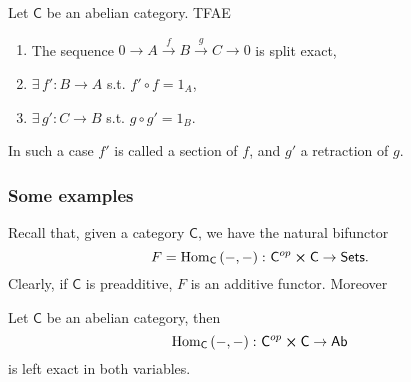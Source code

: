 \begin{prop}
	Let $\mathsf{C}$ be an abelian category.
	TFAE
	\begin{enumerate}
		\item The sequence $0 \to A \xrightarrow{f} B \xrightarrow{g} C \to 0$ is split exact,
		\item $\exists\, f'\colon B \to A$ s.t. $f' \circ f = 1_A$,
		\item $\exists\, g'\colon C \to B$ s.t. $g \circ g' = 1_B$.
	\end{enumerate}
	In such a case $f'$ is called a section of $f$, and $g'$ a retraction of $g$.
\end{prop} 

\subsubsection{Some examples}
Recall that, given a category $\mathsf{C}$, we have the natural bifunctor
\begin{equation}
F = \mathrm{Hom}_{\mathsf{C}} \left( - , - \right)\colon \mathsf{C}^{op} \cross \mathsf{C} \to \mathsf{Sets}
.\end{equation} 
Clearly, if $\mathsf{C}$ is preadditive, $F$ is an additive functor. Moreover

\begin{prop}
	Let $\mathsf{C}$ be an abelian category, then
	\begin{equation}
	\mathrm{Hom}_{\mathsf{C}} \left( -, - \right)\colon \mathsf{C}^{op} \cross \mathsf{C} \to \mathsf{Ab}
	\end{equation} 
	is left exact in both variables.
\end{prop} 

